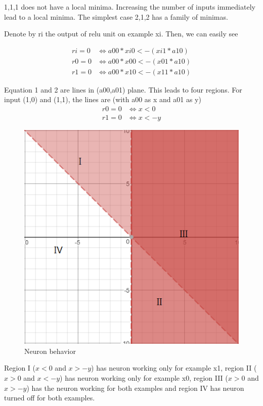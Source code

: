 \documentclass[conference]{IEEEtran}
\begin{document}
1,1,1 does not have a local minima. Increasing the number of inputs immediately lead to a local minima. The simplest case 2,1,2 has a family of minimas.

Denote by ri the output of relu unit on example xi. Then, we can easily see

\begin{align}
ri = 0 &\iff a00*xi0 < -(xi1*a10) \\
r0 = 0 &\iff a00*x00 < -(x01*a10) \\
r1 = 0 &\iff a00*x10 < -(x11*a10)
\end{align}

Equation 1 and 2 are lines in (a00,a01) plane. This leads to four regions. For input (1,0) and (1,1), the lines are (with a00 as x and a01 as y)
\begin{align}
r0 = 0 &\iff x < 0 \\
r1 = 0 &\iff x < -y
\end{align}

\begin{figure}
	\includegraphics[width=\linewidth]{images/nn/212loss.png}
	\caption{Neuron behavior}
	\label{fig:nnbehave}
\end{figure}

Region I ($x<0$ and $x>-y$) has neuron working only for example x1, region II ($x>0$ and $x<-y$) has neuron working only for example x0, region III ($x>0$ and $x>-y$) has the neuron working for both examples and region IV has neuron turned off for both examples.
\end{document}
